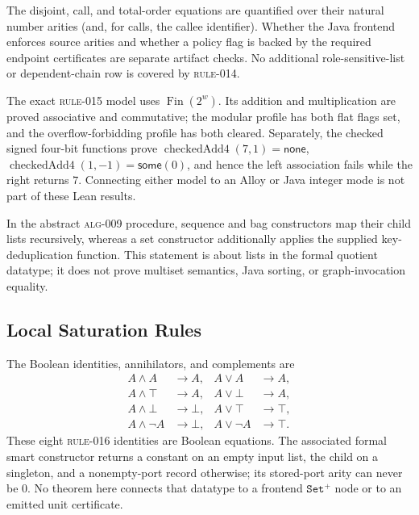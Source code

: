 The disjoint, call, and total-order equations are quantified over their natural
number arities (and, for calls, the callee identifier).  Whether the Java
frontend enforces source arities and whether a policy flag is backed by the
required endpoint certificates are separate artifact checks.  No additional
role-sensitive-list or dependent-chain row is covered by \textsc{rule-014}.

The exact \textsc{rule-015} model uses $\operatorname{Fin}(2^w)$.  Its addition
and multiplication are proved associative and commutative; the modular profile
has both flat flags set, and the overflow-forbidding profile has both cleared.
Separately, the checked signed four-bit functions prove
$\operatorname{checkedAdd4}(7,1)=\mathsf{none}$,
$\operatorname{checkedAdd4}(1,-1)=\mathsf{some}(0)$, and hence the left
association fails while the right returns $7$.  Connecting either model to an
Alloy or Java integer mode is not part of these Lean results.

In the abstract \textsc{alg-009} procedure, sequence and bag constructors map
their child lists recursively, whereas a set constructor additionally applies
the supplied key-deduplication function.  This statement is about lists in the
formal quotient datatype; it does not prove multiset semantics, Java sorting,
or graph-invocation equality.

\subsection{Local Saturation Rules}

The Boolean identities, annihilators, and complements are
\begin{align*}
 A\land A&\longrightarrow A,& A\lor A&\longrightarrow A,\\
 A\land\top&\longrightarrow A,& A\lor\bot&\longrightarrow A,\\
 A\land\bot&\longrightarrow\bot,& A\lor\top&\longrightarrow\top,\\
 A\land\neg A&\longrightarrow\bot,&
 A\lor\neg A&\longrightarrow\top.
\end{align*}
These eight \textsc{rule-016} identities are Boolean equations.  The associated
formal smart constructor returns a constant on an empty input list, the child
on a singleton, and a nonempty-port record otherwise; its stored-port arity can
never be $0$.  No theorem here connects that datatype to a frontend
$\texttt{Set}^+$ node or to an emitted unit certificate.

